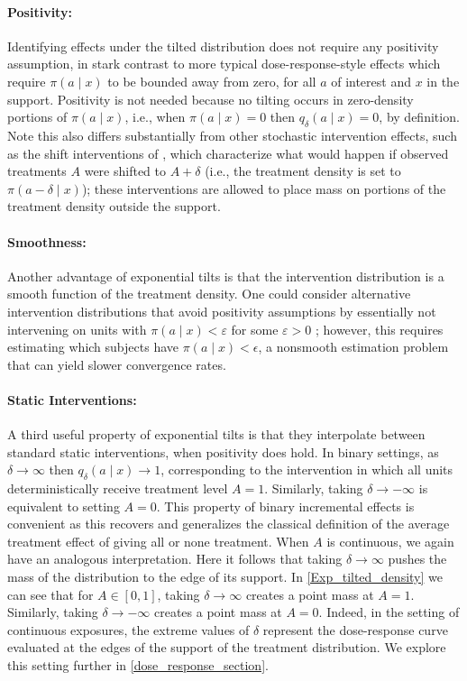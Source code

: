 \documentclass[11pt,twoside]{article}
\theoremstyle{definition}
\theoremstyle{remark}
\begin{document}
\paragraph{Positivity:} Identifying effects under the tilted distribution does not require any positivity assumption, in stark contrast to more typical dose-response-style effects which require $\pi(a \mid x)$ to be bounded away from zero, for all $a$ of interest and $x$ in the support. Positivity is not needed because no tilting occurs in zero-density portions of $\pi(a \mid x)$, i.e., when $\pi(a \mid x) = 0$ then $q_\delta(a \mid x) = 0$, by definition. Note this also differs substantially from other stochastic intervention effects, such as the shift interventions of  \cite{munoz2012population}, which characterize what would happen if observed treatments $A$ were shifted to $A + \delta$ (i.e., the treatment density is set to $\pi(a - \delta \mid x)$); these interventions are allowed to place mass on portions of the treatment density outside the support. 

\paragraph{Smoothness:} Another advantage of exponential tilts is that the intervention distribution is a smooth function of the treatment density. One could consider alternative intervention distributions that avoid  positivity assumptions by essentially not intervening on units with $\pi(a \mid x) < \varepsilon$ for some $\varepsilon > 0$ \citep{van2007causal, branson2023causal}; however, this requires estimating which subjects have $\pi(a \mid x)<\epsilon$, a nonsmooth estimation problem that can yield slower convergence rates. 


\paragraph{Static Interventions:} A third useful property of exponential tilts is that they interpolate between standard static interventions, when positivity does hold. In binary settings, as $\delta \to \infty$ then $q_{\delta}(a \mid x) \to 1$, corresponding to the intervention in which all units deterministically receive treatment level $A = 1$. Similarly, taking $\delta \to - \infty$ is equivalent to setting $A = 0$. This property of binary incremental effects is convenient as this recovers and generalizes the classical definition of the average treatment effect of giving all or none treatment. When $A$ is continuous, we again have an analogous interpretation. Here it follows that taking $\delta \to \infty$ pushes the mass of the distribution to the edge of its support. In \cref{Exp_tilted_density} we can see that for $A \in [0, 1]$, taking $\delta \to \infty$ creates a point mass at $A = 1$. Similarly, taking $\delta \to - \infty$ creates a point mass at $A = 0$. Indeed, in the setting of continuous exposures, the extreme values of $\delta$ represent the dose-response curve evaluated at the edges of the support of the treatment distribution. We explore this setting further in \cref{dose_response_section}.
\end{document}
